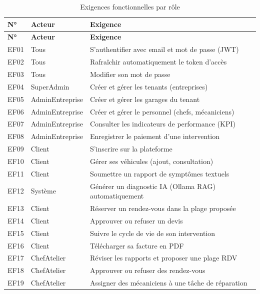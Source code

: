 \begin{longtable}{|p{0.8cm}|p{2.8cm}|p{8cm}|}
\caption{Exigences fonctionnelles par rôle}\label{tab:exigences}\\
\hline
\rowcolor{gray!20}
\textbf{N°} & \textbf{Acteur} & \textbf{Exigence} \\
\hline
\endfirsthead
\hline
\rowcolor{gray!20}
\textbf{N°} & \textbf{Acteur} & \textbf{Exigence} \\
\hline
\endhead
\hline
\endlastfoot
EF01 & Tous & S'authentifier avec email et mot de passe (JWT) \\[2pt]\hline
EF02 & Tous & Rafraîchir automatiquement le token d'accès \\[2pt]\hline
EF03 & Tous & Modifier son mot de passe \\[2pt]\hline
EF04 & SuperAdmin & Créer et gérer les tenants (entreprises) \\[2pt]\hline
EF05 & AdminEntreprise & Créer et gérer les garages du tenant \\[2pt]\hline
EF06 & AdminEntreprise & Créer et gérer le personnel (chefs, mécaniciens) \\[2pt]\hline
EF07 & AdminEntreprise & Consulter les indicateurs de performance (KPI) \\[2pt]\hline
EF08 & AdminEntreprise & Enregistrer le paiement d'une intervention \\[2pt]\hline
EF09 & Client & S'inscrire sur la plateforme \\[2pt]\hline
EF10 & Client & Gérer ses véhicules (ajout, consultation) \\[2pt]\hline
EF11 & Client & Soumettre un rapport de symptômes textuels \\[2pt]\hline
EF12 & Système & Générer un diagnostic IA (Ollama RAG) automatiquement \\[2pt]\hline
EF13 & Client & Réserver un rendez-vous dans la plage proposée \\[2pt]\hline
EF14 & Client & Approuver ou refuser un devis \\[2pt]\hline
EF15 & Client & Suivre le cycle de vie de son intervention \\[2pt]\hline
EF16 & Client & Télécharger sa facture en PDF \\[2pt]\hline
EF17 & ChefAtelier & Réviser les rapports et proposer une plage RDV \\[2pt]\hline
EF18 & ChefAtelier & Approuver ou refuser des rendez-vous \\[2pt]\hline
EF19 & ChefAtelier & Assigner des mécaniciens à une tâche de réparation \\[2pt]\hline

\end{longtable}
